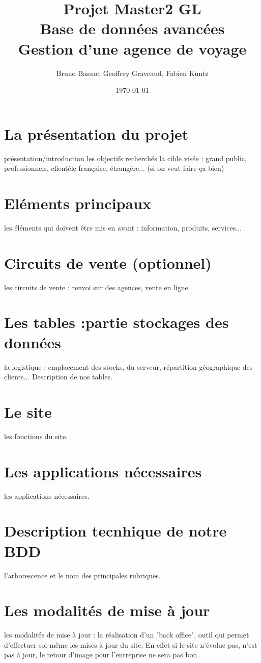 \documentclass[10pt]{article}
\author{Bruno Bassac, Geoffrey Graveaud, Fabien Kuntz}
\title{\textbf{Projet Master2 GL} \\
\textbf{Base de données avancées} \\
Gestion d'une agence de voyage}
\date{\today}
\begin{document}
\maketitle
\tableofcontents
\section{La présentation du projet}
présentation/introduction
les objectifs recherchés
la cible visée : grand public, professionnels, clientèle française, étrangère... (si on veut faire ça bien)

\section{Eléments principaux}
les éléments qui doivent être mis en avant : information, produits, services...
\section{Circuits de vente (optionnel)}
les circuits de vente : renvoi sur des agences, vente en ligne...
\section{Les tables :partie stockages des données}
la logistique : emplacement des stocks, du serveur, répartition géographique des clients...
Description de nos tables.
\section{Le site}
les fonctions du site.
\section{Les applications nécessaires}
les applications nécessaires.
\section{Description tecnhique de notre BDD}
l'arborescence et le nom des principales rubriques.
\section{Les modalités de mise à jour}
les modalités de mise à jour : la réalisation d'un "back office", outil qui permet d'effectuer soi-même les mises à jour du site.
En effet si le site n'évolue pas, n'est pas à jour, le retour d'image pour l'entreprise ne sera pas bon.
\end{document}
